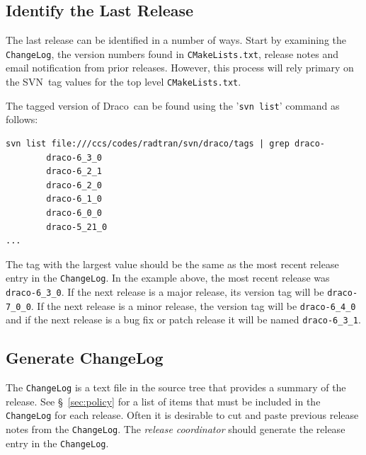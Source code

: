 \documentclass[note]{newmemo}
\newcommand{\draco}{{\normalfont\small\sffamily Draco}}
\newcommand{\svn}{\textsf{SVN}}
\begin{document}

\subsection{Identify the Last Release}
\label{sec:last_rel}

The last release can be identified in a number of ways.  Start by
examining the \texttt{ChangeLog}, the version numbers found in
\texttt{CMakeLists.txt}, release notes and email notification from
prior releases.  However, this process will rely primary on the
\svn\ tag values for the top level \texttt{CMakeLists.txt}.

The tagged version of \draco\ can be found using the '\texttt{svn list}' command as follows:
%
\begin{lstlisting}[basicstyle=\footnotesize, xleftmargin=1.0in, 
  xrightmargin=1.0in]
svn list file:///ccs/codes/radtran/svn/draco/tags | grep draco-
        draco-6_3_0
        draco-6_2_1
        draco-6_2_0
        draco-6_1_0
        draco-6_0_0
        draco-5_21_0
...
\end{lstlisting}
%
The tag with the largest value should be the same as the most recent release entry in the \texttt{ChangeLog}.
In the example above, the most recent release was \texttt{draco-6\_3\_0}.  If the
next release is a major release, its version tag will be
\texttt{draco-7\_0\_0}.  If the next release is a minor release, the
version tag will be \texttt{draco-6\_4\_0} and if the next release is
a bug fix or patch release it will be named \texttt{draco-6\_3\_1}.


\subsection{Generate ChangeLog}
\label{sec:changelog}

The \texttt{ChangeLog} is a text file in the source tree that provides
a summary of the release.  See \S~\ref{sec:policy} for a list of items
that must be included in the \texttt{ChangeLog} for each release.
Often it is desirable to cut and paste previous release notes from
the \texttt{ChangeLog}.  The {\it release coordinator} should generate
the release entry in the \texttt{ChangeLog}.
\end{document}
